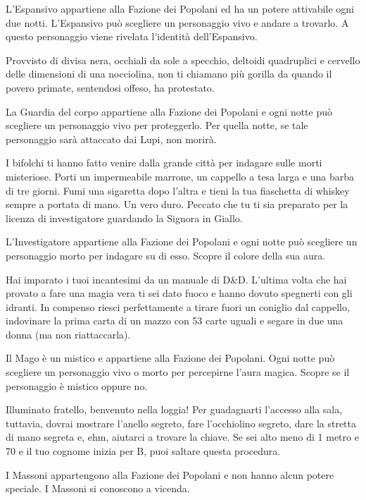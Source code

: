 {{{{{{{{{{{{{L'Espansivo appartiene alla Fazione dei Popolani ed ha un potere attivabile ogni due notti. L'Espansivo può scegliere un personaggio vivo e andare a trovarlo. A questo personaggio viene rivelata l'identità dell'Espansivo.
{%


{%
Provvisto di divisa nera, occhiali da sole a specchio, deltoidi quadruplici e cervello delle dimensioni di una nocciolina, non ti chiamano più gorilla da quando il povero primate, sentendosi offeso, ha protestato.

La Guardia del corpo appartiene alla Fazione dei Popolani e ogni notte può scegliere un personaggio vivo per proteggerlo. Per quella notte, se tale personaggio sarà attaccato dai Lupi, non morirà.
{%


{%
I bifolchi ti hanno fatto venire dalla grande città per indagare sulle morti misteriose. Porti un impermeabile marrone, un cappello a tesa larga e una barba di tre giorni. Fumi una sigaretta dopo l'altra e tieni la tua fiaschetta di whiskey sempre a portata di mano. Un vero duro. Peccato che tu ti sia preparato per la licenza di investigatore guardando la Signora in Giallo.

L'Investigatore appartiene alla Fazione dei Popolani e ogni notte può scegliere un personaggio morto per indagare su di esso. Scopre il colore della sua aura.
{%


{%
Hai imparato i tuoi incantesimi da un manuale di D\&D. L'ultima volta che hai provato a fare una magia vera ti sei dato fuoco e hanno dovuto spegnerti con gli idranti. In compenso riesci perfettamente a tirare fuori un coniglio dal cappello, indovinare la prima carta di un mazzo con 53 carte uguali e segare in due una donna (ma non riattaccarla).

Il Mago è un mistico e appartiene alla Fazione dei Popolani. Ogni notte può scegliere un personaggio vivo o morto per percepirne l'aura magica. Scopre se il personaggio è mistico oppure no.
{%


{%
Illuminato fratello, benvenuto nella loggia! Per guadagnarti l'accesso alla sala, tuttavia, dovrai mostrare l'anello segreto, fare l'occhiolino segreto, dare la stretta di mano segreta e, ehm, aiutarci a trovare la chiave. Se sei alto meno di 1 metro e 70 e il tuo cognome inizia per B, puoi saltare questa procedura.

I Massoni appartengono alla Fazione dei Popolani e non hanno alcun potere speciale. I Massoni si conoscono a vicenda.
{%


}}}}}}}}}}}}}}}}}}}}}}
